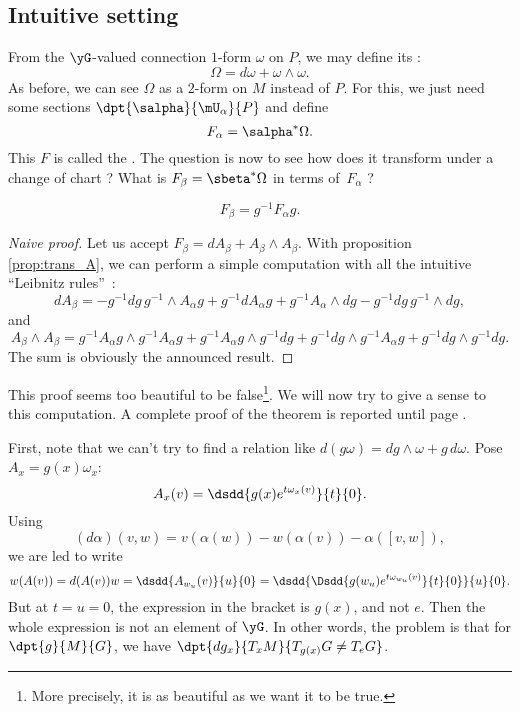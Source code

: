 \subsection{Intuitive setting}

From the $\yG$-valued connection $1$-form $\omega$ on $P$, we may define its  :
\begin{equation}
     \Omega=d\omega+\omega\wedge\omega.
\end{equation}
As before, we can see $\Omega$ as a $2$-form on $M$ instead of $P$. For this, we just need some sections $\dpt{\salpha}{\mU_{\alpha}}{P}$ and define
\begin{equation}
        F_{\alpha}=\salpha^*\Omega.
\end{equation}
This $F$ is called the . The question is now to see how does it transform under a change of chart ? What is $F_{\beta}=\sbeta^*\Omega$ in terms of~$F_{\alpha}$ ?

\begin{theorem}
\begin{equation}
     F_{\beta}=g^{-1} F_{\alpha} g.
\end{equation}
\label{tho:trans_F}
\end{theorem}

\begin{proof}[Naive proof]
Let us accept $F_{\beta}=dA_{\beta}+A_{\beta}\wedge A_{\beta}$. With proposition \ref{prop:trans_A}, we can perform a simple computation with all the intuitive ``Leibnitz rules''\ :
\[
   dA_{\beta}=-g^{-1} dg\, g^{-1}\wedge A_{\alpha} g+g^{-1} dA_{\alpha} g+g^{-1} A_{\alpha}\wedge dg-g^{-1} dg\,g^{-1}\wedge dg,
\]
and
\[
  A_{\beta}\wedge A_{\beta}=g^{-1} A_{\alpha} g\wedge g^{-1} A_{\alpha} g+g^{-1} A_{\alpha} g\wedge g^{-1} dg+g^{-1} dg\wedge g^{-1} A_{\alpha} g+g^{-1} dg\wedge g^{-1} dg.
\]
The sum is obviously the announced result.
\end{proof}
This proof seems too beautiful to be false\footnote{More precisely, it is as beautiful as we want it to be true.}. We will now try to give a sense to this computation.
A complete proof of the theorem is reported until page \pageref{preuve_trans_F}.

First, note that we can't try to find a relation like $d(g\omega)=dg\wedge\omega+g\,d\omega$. Pose $A_x=g(x)\omega_x$:
\[
  A_x(v)=\dsdd{g(x)e^{t\omega_x(v)}}{t}{0}.
\]
Using
\[
   (d\alpha)(v,w)=v(\alpha(w))-w(\alpha(v))-\alpha([v,w]),
\]
we are led to write
\begin{equation}
     w(A(v))=d(A(v))w
            =\dsdd{A_{w_u}(v)}{u}{0}
	    =\dsdd{ \Dsdd{g(w_u)e^{t\omega_{w_u}(v)}}{t}{0} }{u}{0}.
\end{equation}
But at $t=u=0$, the expression in the bracket is $g(x)$, and not $e$. Then the whole expression is not an element of $\yG$. In other words, the problem is that for $\dpt{g}{M}{G}$, we have $\dpt{dg_x}{T_xM}{T_{g(x)}G\neq T_eG}$.

